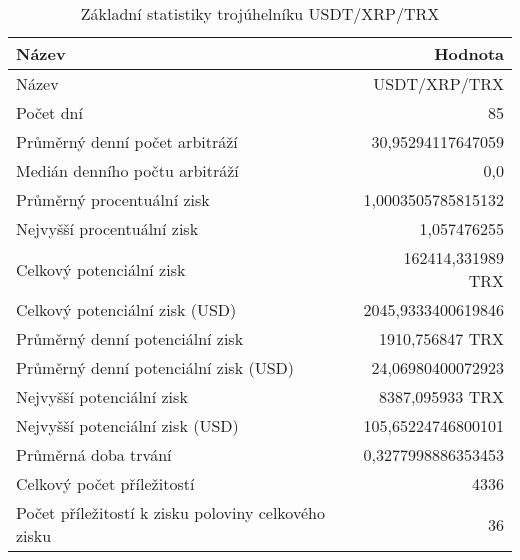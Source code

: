 \begin{table}\centering
\caption{Základní statistiky trojúhelníku USDT/XRP/TRX}
\label{USDTXRPTRX_stats}
\begin{tabular}{|| l | r ||}
\hline Název & Hodnota \\ 
\hline\hline Název & USDT/XRP/TRX \\ 
\hline Počet dní & 85 \\ 
\hline Průměrný denní počet arbitráží & 30,95294117647059 \\ 
\hline Medián denního počtu arbitráží & 0,0 \\ 
\hline Průměrný procentuální zisk & 1,0003505785815132 \\ 
\hline Nejvyšší procentuální zisk & 1,057476255 \\ 
\hline Celkový potenciální zisk & 162414,331989 TRX \\ 
\hline Celkový potenciální zisk (USD) & 2045,9333400619846 \\ 
\hline Průměrný denní potenciální zisk & 1910,756847 TRX \\ 
\hline Průměrný denní potenciální zisk (USD) & 24,06980400072923 \\ 
\hline Nejvyšší potenciální zisk & 8387,095933 TRX \\ 
\hline Nejvyšší potenciální zisk (USD) & 105,65224746800101 \\ 
\hline Průměrná doba trvání & 0,3277998886353453 \\ 
\hline Celkový počet příležitostí & 4336 \\ 
\hline Počet příležitostí k zisku poloviny celkového zisku & 36 \\ 
\hline
\end{tabular}
\end{table}